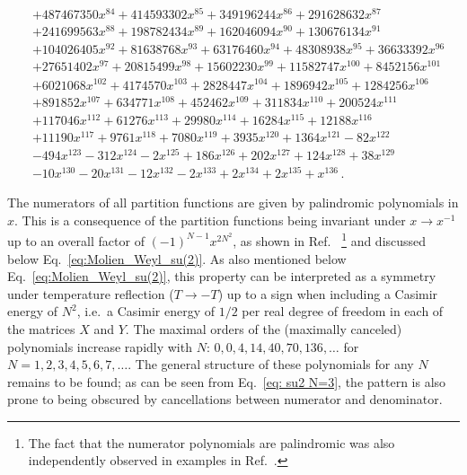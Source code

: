 \documentclass[a4paper,11pt]{article}
\begin{document}
\begin{align}
	&+487467350x^{84}+414593302 x^{85}+349196244 x^{86}+291628632 x^{87}\nonumber\\
	&+241699563 x^{88}+198782434 x^{89}+162046094 x^{90}+130676134 x^{91}\nonumber\\
	&+104026405 x^{92}+81638768x^{93}+63176460 x^{94}+48308938 x^{95}+36633392 x^{96}\nonumber\\
	&+27651402 x^{97}+20815499 x^{98}+15602230 x^{99}+11582747 x^{100}+8452156 x^{101}\nonumber\\
	&+6021068 x^{102}+4174570x^{103}+2828447 x^{104}+1896942 x^{105}+1284256 x^{106}\nonumber\\
	&+891852 x^{107}+634771 x^{108}+452462 x^{109}+311834 x^{110}+200524 x^{111}\nonumber\\
	&+117046 x^{112}+61276x^{113}+29980 x^{114}+16284 x^{115}+12188 x^{116}\nonumber\\
	&+11190 x^{117}+9761 x^{118}+7080 x^{119}+3935 x^{120}+1364 x^{121}-82 x^{122}\nonumber\\
	&-494 x^{123}-312 x^{124}-2x^{125}+186 x^{126}+202 x^{127}+124 x^{128}+38 x^{129}\nonumber\\
	&-10 x^{130}-20 x^{131}-12 x^{132}-2 x^{133}+2 x^{134}+2 x^{135}+x^{136} \, .
\end{align}
\endgroup


The numerators of all partition functions are given by palindromic polynomials in $x$.
This is a consequence of the partition functions being invariant under $x\rightarrow x^{-1}$ up to an overall factor of $(-1)^{N-1}x^{2N^2}$, as shown in Ref.\ \cite{teranishi1986}%
\footnote{The fact that the numerator polynomials are palindromic was also independently observed in examples in Ref.\ \cite{Harmark:2014mpa}.} and discussed below  Eq.\ \eqref{eq:Molien_Weyl_su(2)}.
As also mentioned below Eq.\ \eqref{eq:Molien_Weyl_su(2)}, this property can be interpreted as a symmetry under temperature reflection ($T\to-T$) up to a sign when including a Casimir energy of $N^2$, i.e.\ a Casimir energy of $1/2$ per real degree of freedom in each of the matrices $X$ and $Y$. 
% 
The maximal orders of the (maximally canceled) polynomials increase rapidly with $N$: $0,0,4,14,40,70,136,\dots$ for $N=1,2,3,4,5,6,7,\dots$. The general structure of these polynomials for any $N$ remains to be found; as can be seen from Eq.\ \eqref{eq: su2 N=3}, the pattern is also prone to being obscured by cancellations between numerator and denominator.
\end{document}
